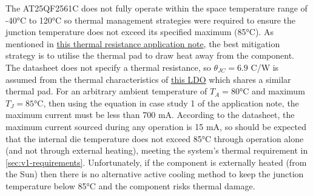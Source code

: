 The AT25QF2561C does not fully operate within the space temperature range of -40°C to 120°C so thermal management strategies were required to ensure the junction temperature does not exceed its specified maximum (85°C). As mentioned in \href{https://www.renesas.com/en/document/apn/thermal-resistance-and-its-applications}{this thermal resistance application note}, the best mitigation strategy is to utilise the thermal pad to draw heat away from the component. The datasheet does not specify a thermal resistance, so $\theta_{JC}=6.9$ C/W is assumed from the thermal characteristics of \href{https://www.onsemi.com/pdf/datasheet/ncp189-d.pdf}{this LDO} which shares a similar thermal pad. For an arbitrary ambient temperature of $T_A=80$°C and maximum $T_J=85$°C, then using the equation in case study 1 of the application note, the maximum current must be less than 700 mA. According to the datasheet, the maximum current sourced during any operation is 15 mA, so should be expected that the internal die temperature does not exceed 85°C through operation alone (and not through external heating), meeting the system's thermal requirement in \autoref{sec:v1-requirements}. Unfortunately, if the component is externally heated (from the Sun) then there is no alternative active cooling method to keep the junction temperature below 85°C and the component risks thermal damage.